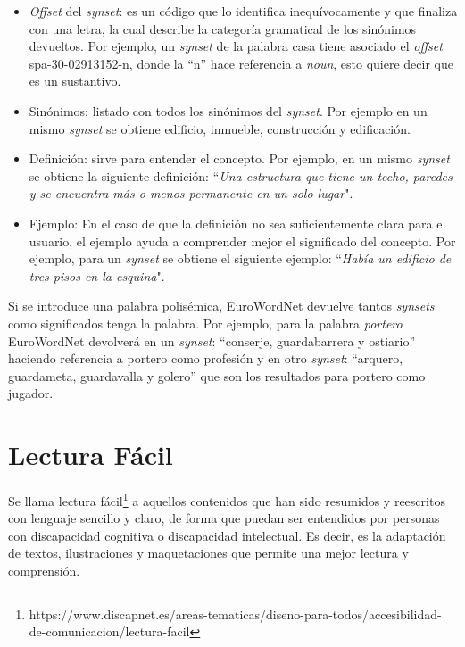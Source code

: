 

\begin{itemize}
	
	\item \textit{Offset} del \textit{synset}: es un código que lo identifica inequívocamente y que finaliza con una letra, la cual describe la categoría gramatical de los sinónimos devueltos. Por ejemplo, un \textit{synset} de la palabra casa tiene asociado el \textit{offset} spa-30-02913152-n, donde la ``n'' hace referencia a \textit{noun}, esto quiere decir que es un sustantivo. 
	\item Sinónimos: listado con todos los sinónimos del \textit{synset}. Por ejemplo en un mismo \textit{synset} se obtiene edificio, inmueble, construcción y edificación.
	\item Definición: sirve para entender el concepto. Por ejemplo, en un mismo \textit{synset} se obtiene la siguiente definición: ``\textit{Una estructura que tiene un techo, paredes y se encuentra más o menos permanente en un solo lugar}".
	\item Ejemplo: En el caso de que la definición no sea suficientemente clara para el usuario, el ejemplo ayuda a comprender mejor el significado del concepto. Por ejemplo, para un \textit{synset} se obtiene el siguiente ejemplo: ``\textit{Había un edificio de tres pisos en la esquina}". 
\end{itemize} 

Si se introduce una palabra polisémica, EuroWordNet devuelve tantos \textit{synsets} como significados tenga la palabra.
Por ejemplo, para la palabra \textit{portero} EuroWordNet devolverá en un \textit{synset}: ``conserje, guardabarrera y ostiario'' haciendo referencia a portero como profesión y en otro \textit{synset}: ``arquero, guardameta, guardavalla y golero'' que son los resultados para portero como jugador. 

\vfill

\section{Lectura Fácil}
\label{cap:sec:lecturafacil}

Se llama lectura fácil\footnote{https://www.discapnet.es/areas-tematicas/diseno-para-todos/accesibilidad-de-comunicacion/lectura-facil} a aquellos contenidos que han sido resumidos y reescritos con lenguaje sencillo y claro, de forma que puedan ser entendidos por personas con discapacidad cognitiva o discapacidad intelectual. Es decir, es la adaptación de textos, ilustraciones y maquetaciones que permite una mejor lectura y comprensión.



